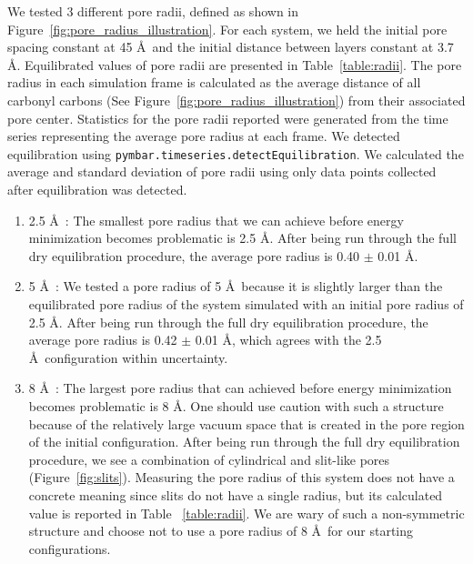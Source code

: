 \documentclass[journal=jpcbfk,manusciprt=article]{achemso}
\begin{document}
	  We tested 3 different pore radii, defined as shown in
	  Figure~\ref{fig:pore_radius_illustration}. For each system, we held the initial
	  pore spacing constant at 45 \AA~and the initial distance between layers
	  constant at 3.7 \AA. Equilibrated values of pore radii are presented in
	  Table~\ref{table:radii}. The pore radius in each simulation frame is calculated
	  as the average distance of all carbonyl carbons (See
	  Figure~\ref{fig:pore_radius_illustration}) from their associated pore center.
	  Statistics for the pore radii reported were generated from the time series
	  representing the average pore radius at each frame. We detected equilibration
	  using \texttt{pymbar.timeseries.detectEquilibration}. We calculated the average
	  and standard deviation of pore radii using only data points collected after
	  equilibration was detected.

	  \begin{enumerate}

		\item 2.5 \AA~: The smallest pore radius that we can achieve
		before energy minimization becomes problematic is 2.5 \AA. After being run
		through the full dry equilibration procedure, the average pore radius is 0.40
		$\pm$ 0.01 \AA.

		\item 5 \AA~: We tested a pore radius of 5 \AA~because it is
		slightly larger than the equilibrated pore radius of the system simulated with
		an initial pore radius of 2.5 \AA. After being run through the full dry
		equilibration procedure, the average pore radius is 0.42 $\pm$ 0.01 \AA, which
		agrees with the 2.5 \AA~configuration within uncertainty. 

		\item 8 \AA~: The largest pore radius that can achieved before
		energy minimization becomes problematic is 8 \AA. One should use caution with
		such a structure because of the relatively large vacuum space that is created
		in the pore region of the initial configuration. After being run through the
		full dry equilibration procedure, we see a combination of cylindrical and
		slit-like pores (Figure~\ref{fig:slits}). Measuring the pore radius of this
		system does not have a concrete meaning since slits do not have a single
		radius, but its calculated value is reported in Table ~\ref{table:radii}. We
		are wary of such a non-symmetric structure and choose not to use a pore radius
		of 8 \AA~for our starting configurations. 
	  
	  \end{enumerate}
\end{document}
